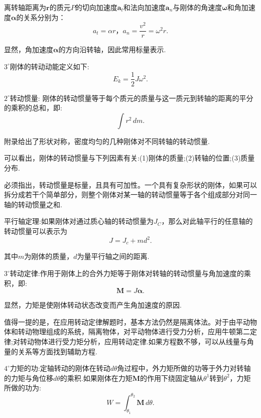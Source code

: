 \documentclass[UTF8]{ctexart}
\begin{document}
	离转轴距离为${\boldsymbol r}$的质元$P$的切向加速度${\boldsymbol a}_t$和法向加速度${\boldsymbol a}_n$与刚体的角速度${\boldsymbol \omega}$和角加速度${\boldsymbol \alpha}$的关系分别为：
	\begin{equation*}
		a_t=\alpha r\text{，}a_n=\frac{v^2}{r}=\omega^2r.
	\end{equation*}

	显然，角加速度${\boldsymbol \alpha}$的方向沿转轴，因此常用标量表示.

	$3^{\circ}$刚体的转动动能定义如下:
	\begin{equation*}
		E_k=\frac{1}{2}J\omega^2.
	\end{equation*}

	$2^{\circ}$转动惯量:
	刚体的转动惯量等于每个质元的质量与这一质元到转轴的距离的平分的乘积的总和，即:
	\begin{equation*}
		\int r^2 \,dm.
	\end{equation*}

	附录给出了形状对称，密度均匀的几种刚体对不同转轴的转动惯量.

	可以看出，刚体的转动惯量与下列因素有关:(1)刚体的质量;(2)转轴的位置;(3)质量分布.

	必须指出，转动惯量是标量，且具有可加性。一个具有复杂形状的刚体，如果可以拆分成若干个简单部分，则整个刚体对某一轴的转动惯量等于各个组成部分对同一轴的转动惯量之和.

	平行轴定理:如果刚体对通过质心轴的转动惯量为$J_C$，那么对此轴平行的任意轴的转动惯量可以表示为
	\begin{equation*}
		J=J_c+md^2.
	\end{equation*}

	其中$m$为刚体的质量，$d$为量平行轴之间的距离.

	$3^{\circ}$转动定律:作用于刚体上的合外力矩等于刚体对转轴的转动惯量与角加速度的乘积，即:
	\begin{equation*}
		{\boldsymbol M}=J{\boldsymbol \alpha}.
	\end{equation*}
	
	显然，力矩是使刚体转动状态改变而产生角加速度的原因.

	值得一提的是，在应用转动定律解题时，基本方法仍然是隔离体法。对于由平动物体和转动物理组成的系统，隔离物体，对平动物体进行受力分析，应用牛顿第二定律;对转动物体进行受力矩分析，应用转动定律.如果方程数不够，可以从线量与角量的关系等方面找到辅助方程.

	$4^{\circ}$力矩的功:定轴转动的刚体在转动$d\theta$角过程中，外力矩所做的功等于外力对转轴的力矩与角位移$d\theta$的乘积.如果刚体在力矩${\boldsymbol M}$的作用下绕固定轴从$\theta^1$转到$\theta^2$，力矩所做的功为:
	\begin{equation*}
		W=\int_{\theta_1}^{\theta_2}{\boldsymbol M} \,d\theta.
	\end{equation*}
\end{document}
